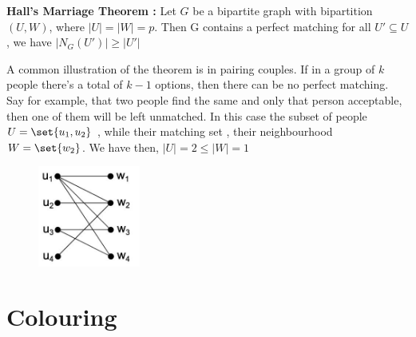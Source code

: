 \documentclass[english,course]{Notes}
\begin{document}


\begin{theorem}
	\textbf{Hall's Marriage Theorem :} Let $G$ be a bipartite graph with bipartition $(U,W)$, where $|U| = |W| = p$. Then G contains a perfect matching  for all $U' \subseteq U$ , we have $|N_{G}(U')| \geq |U'|$
\end{theorem}



\example{}
\par{A common illustration of the theorem is in pairing couples. If in a group of $k$ people there's a total of $k-1$ options, then there can be no perfect matching. Say for example, that two people find the same and only that person acceptable, then one of them will be left unmatched. In this case the subset of people $U= \set{u_{1}, u_{2}}$ , while their matching set , their neighbourhood $ W=\set{w_{2}}$. We have then, $|U| = 2 \leq |W| = 1$}


\begin{figure}[ht]
\centering
\includegraphics[width=0.3\textwidth]{hallExample.png}
\end{figure}




\section
{Colouring}

\end{document}
